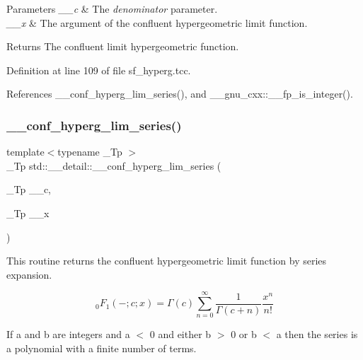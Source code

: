 \begin{DoxyParams}{Parameters}
{\em \+\_\+\+\_\+c} & The {\itshape denominator} parameter. \\
\hline
{\em \+\_\+\+\_\+x} & The argument of the confluent hypergeometric limit function. \\
\hline
\end{DoxyParams}
\begin{DoxyReturn}{Returns}
The confluent limit hypergeometric function. 
\end{DoxyReturn}


Definition at line 109 of file sf\+\_\+hyperg.\+tcc.



References \+\_\+\+\_\+conf\+\_\+hyperg\+\_\+lim\+\_\+series(), and \+\_\+\+\_\+gnu\+\_\+cxx\+::\+\_\+\+\_\+fp\+\_\+is\+\_\+integer().

\mbox{\label{namespacestd_1_1____detail_a44b73ec79e0a8cfd1f29a21cb39f2bdc}} 
\subsubsection{\texorpdfstring{\+\_\+\+\_\+conf\+\_\+hyperg\+\_\+lim\+\_\+series()}{\_\_conf\_hyperg\_lim\_series()}}
{\footnotesize\ttfamily template$<$typename \+\_\+\+Tp $>$ \\
\+\_\+\+Tp std\+::\+\_\+\+\_\+detail\+::\+\_\+\+\_\+conf\+\_\+hyperg\+\_\+lim\+\_\+series (\begin{DoxyParamCaption}\item[{\+\_\+\+Tp}]{\+\_\+\+\_\+c,  }\item[{\+\_\+\+Tp}]{\+\_\+\+\_\+x }\end{DoxyParamCaption})}



This routine returns the confluent hypergeometric limit function by series expansion. 

\[ {}_0F_1(-;c;x) = \Gamma(c) \sum_{n=0}^{\infty} \frac{1}{\Gamma(c+n)} \frac{x^n}{n!} \]

If a and b are integers and a $<$ 0 and either b $>$ 0 or b $<$ a then the series is a polynomial with a finite number of terms.


